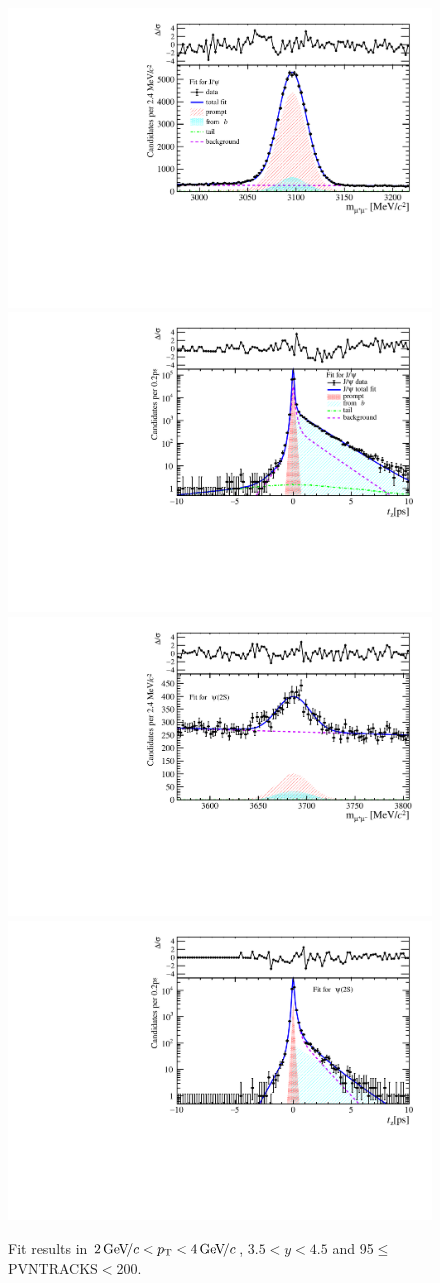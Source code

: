 \begin{figure}[H]
\begin{center}
\includegraphics[width=0.47\linewidth]{pdf/Jpsi/drawmass/n5y3pt2.pdf}
\includegraphics[width=0.47\linewidth]{pdf/Jpsi/2DFit/n5y3pt2.pdf}
\vspace*{-0.5cm}
\includegraphics[width=0.47\linewidth]{pdf/Psi2S/drawmass/n5y3pt2.pdf}
\includegraphics[width=0.47\linewidth]{pdf/Psi2S/2DFit/n5y3pt2.pdf}
\vspace*{-0.5cm}
\end{center}
\caption{Fit results in $2\text{\,Ge\kern -0.1em V\!/}c<p_{\mathrm{T}}<4\text{\,Ge\kern -0.1em V\!/}c$, $3.5<y<4.5$ and 95$\leq$PVNTRACKS$<$200.}
\label{Fitn5y3pt2}
\end{figure}
